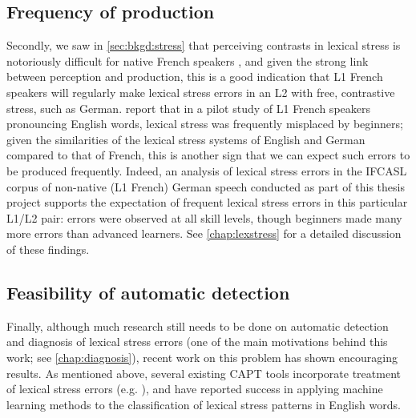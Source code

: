 		\subsection{Frequency of production}
		\label{sec:targeting:frequency}

Secondly, we saw in \cref{sec:bkgd:stress} that perceiving contrasts in lexical stress is notoriously difficult for native French speakers \citep{Cutler2005,Dupoux2008}, and given the strong link between perception and production,
this is a good indication that L1 French speakers will regularly make lexical stress errors in an L2 with free, contrastive stress, such as German. \textcite{Bonneau2011} report that in a pilot study of L1 French speakers pronouncing English words, lexical stress was frequently misplaced by beginners; given the similarities of the lexical stress systems of English and German compared to that of French, this is another sign that we can expect such errors to be produced frequently.
%
Indeed, an analysis of lexical stress errors in the IFCASL corpus of non-native (L1 French) German speech conducted as part of this thesis project supports the expectation of frequent lexical stress errors in this particular L1/L2 pair: 
errors were observed at all skill levels, though beginners made many more errors than advanced learners. See \cref{chap:lexstress} for a detailed discussion of these findings.
	

		\subsection{Feasibility of automatic detection}
		\label{sec:targeting:autodetect}

Finally, although much research still needs to be done on automatic detection and diagnosis of lexical stress errors (one of the main motivations behind this work; see \cref{chap:diagnosis}), recent work on this problem has shown encouraging results. As mentioned above, several existing CAPT tools incorporate treatment of lexical stress errors (e.g. \cite{Wik2009,Bonneau2011}), and \textcite{Shahin2012a,Kim2011} have reported success in applying machine learning methods to the classification of lexical stress patterns in English words. 





